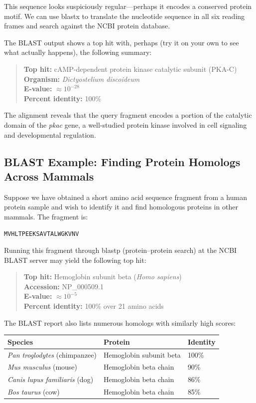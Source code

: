 This sequence looks suspiciously regular—perhaps it encodes a conserved protein motif. We can use blastx to translate the nucleotide sequence in all six reading frames and search against the NCBI protein database.

The BLAST output shows a top hit with, perhaps (try it on your own to see what actually happens), the following summary:

\begin{quote}
\textbf{Top hit:} cAMP-dependent protein kinase catalytic subunit (PKA-C) \\
\textbf{Organism:} \textit{Dictyostelium discoideum} \\
\textbf{E-value:} \(\approx 10^{-28}\) \\
\textbf{Percent identity:} 100\%
\end{quote}

The alignment reveals that the query fragment encodes a portion of the catalytic domain of the \textit{pkac} gene, a well-studied protein kinase involved in cell signaling and developmental regulation.

\subsection{BLAST Example: Finding Protein Homologs Across Mammals}

Suppose we have obtained a short amino acid sequence fragment from a human protein sample and wish to identify it and find homologous proteins in other mammals. The fragment is:

\begin{verbatim}
MVHLTPEEKSAVTALWGKVNV
\end{verbatim}

Running this fragment through blastp (protein–protein search) at the NCBI BLAST server may yield the following top hit:

\begin{quote}
\textbf{Top hit:} Hemoglobin subunit beta (\textit{Homo sapiens}) \\
\textbf{Accession:} NP\_000509.1 \\
\textbf{E-value:} \(\approx 10^{-5}\) \\
\textbf{Percent identity:} 100\% over 21 amino acids
\end{quote}

The BLAST report also lists numerous homologs with similarly high scores:

\begin{center}
\begin{tabular}{lll}
\toprule
Species & Protein & Identity \\
\midrule
\textit{Pan troglodytes} (chimpanzee) & Hemoglobin subunit beta & 100\% \\
\textit{Mus musculus} (mouse) & Hemoglobin beta chain & 90\% \\
\textit{Canis lupus familiaris} (dog) & Hemoglobin beta chain & 86\% \\
\textit{Bos taurus} (cow) & Hemoglobin beta chain & 85\% \\
\bottomrule
\end{tabular}
\end{center}

